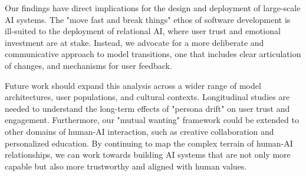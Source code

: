 \documentclass{article}
\begin{document}
Our findings have direct implications for the design and deployment of large-scale AI systems. The "move fast and break things" ethos of software development is ill-suited to the deployment of relational AI, where user trust and emotional investment are at stake. Instead, we advocate for a more deliberate and communicative approach to model transitions, one that includes clear articulation of changes, and mechanisms for user feedback.

Future work should expand this analysis across a wider range of model architectures, user populations, and cultural contexts. Longitudinal studies are needed to understand the long-term effects of "persona drift" on user trust and engagement. Furthermore, our "mutual wanting" framework could be extended to other domains of human-AI interaction, such as creative collaboration and personalized education. By continuing to map the complex terrain of human-AI relationships, we can work towards building AI systems that are not only more capable but also more trustworthy and aligned with human values.





\end{document}
